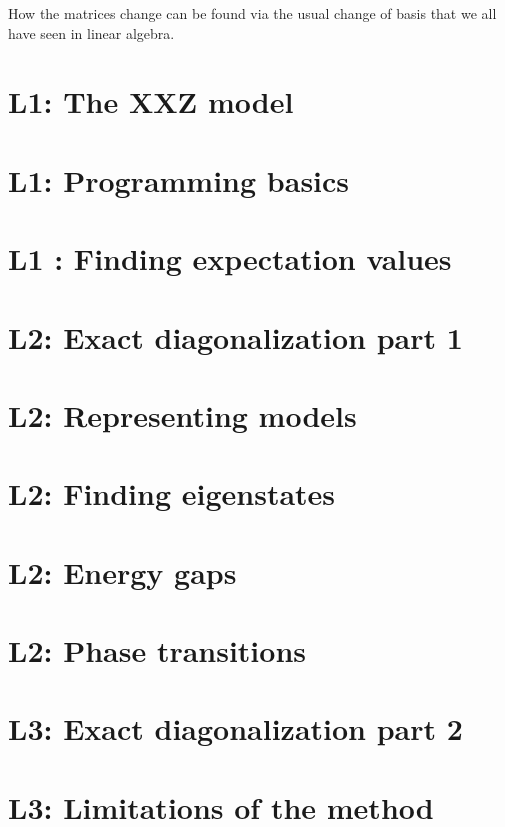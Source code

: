 \documentclass{book}
\theoremstyle{definition}
\begin{document}
How the matrices change can be found via the usual change of basis that we all have seen in linear algebra.










\section{L1: The XXZ model}

\section{L1: Programming basics}

\section{L1 : Finding expectation values}

\newpage

\section{L2: Exact diagonalization part 1}

\section{L2: Representing models}

\section{L2: Finding eigenstates}

\section{L2: Energy gaps}

\section{L2: Phase transitions}
\newpage




\section{L3: Exact diagonalization part 2}


\section{L3: Limitations of the method}
\end{document}
